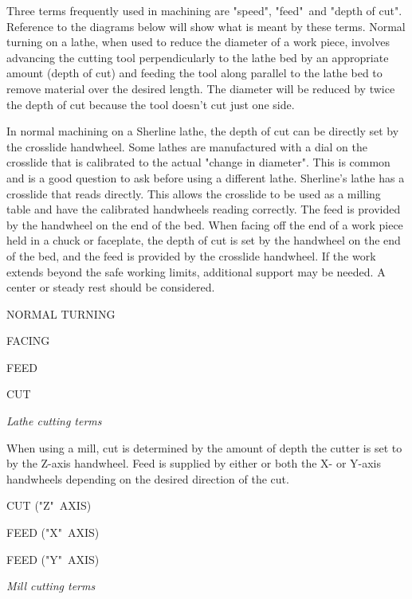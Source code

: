 \secdown


Three terms frequently used in machining are "speed", "feed"\ and "depth of cut".
Reference to the diagrams below will show what is meant by these terms. Normal
turning on a lathe, when used to reduce the diameter of a work piece, involves
advancing the cutting tool perpendicularly to the lathe bed by an appropriate
amount (depth of cut) and feeding the tool along parallel to the lathe bed to
remove material over the desired length. The diameter will be reduced by twice
the depth of cut because the tool doesn't cut just one side.


In normal machining on a Sherline lathe, the depth of cut can be directly set by
the crosslide handwheel. Some lathes are manufactured with a dial on the
crosslide that is calibrated to the actual "change in diameter". This is common
and is a good question to ask before using a different lathe. Sherline's lathe
has a crosslide that reads directly. This allows the crosslide to be used as a
milling table and have the calibrated handwheels reading correctly. The feed is
provided by the handwheel on the end of the bed. When facing off the end of a
work piece held in a chuck or faceplate, the depth of cut is set by the
handwheel on the end of the bed, and the feed is provided by the crosslide
handwheel. If the work extends beyond the safe working limits, additional
support may be needed. A center or steady rest should be considered.

\bigskip
NORMAL TURNING

FACING

FEED

CUT
\bigskip

\textit{Lathe cutting terms}
\bigskip


When using a mill, cut is determined by the amount of depth the cutter is set to
by the Z-axis handwheel. Feed is supplied by either or both the X- or Y-axis
handwheels depending on the desired direction of the cut.

\bigskip
CUT ("Z"\ AXIS)

FEED ("X"\ AXIS)

FEED ("Y"\ AXIS)
\bigskip

\textit{Mill cutting terms}
\bigskip

